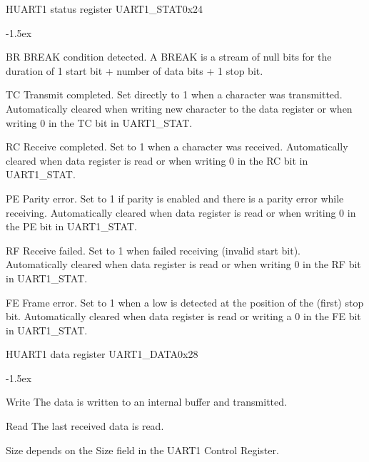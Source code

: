 \documentclass[12pt]{article}
\begin{document}
\begin{register}{H}{UART1 status register UART1\_STAT}{0x24}
\label{uart1stat}
%
%
%
%
%
%
\regnewline%
\end{register}
\begin{regdesc}[0.8\textwidth]\begin{reglist}[0000]
\itemsep-1.5ex
\item[BR] BREAK condition detected. A BREAK is a stream of null bits for the duration of 1 start bit + number of data bits + 1 stop bit.
\item[TC] Transmit completed. Set directly to 1 when a character was transmitted. Automatically cleared when writing new character to the data register or when writing 0 in the TC bit in \mbox{UART1\_STAT}.
\item[RC] Receive completed. Set to 1 when a character was received. Automatically cleared when data register is read or when writing 0 in the RC bit in UART1\_STAT.
\item[PE] Parity error. Set to 1 if parity is enabled and there is a parity error while receiving. Automatically cleared when data register is read or when writing 0 in the PE bit in UART1\_STAT.
\item[RF] Receive failed. Set to 1 when failed receiving (invalid start bit). Automatically cleared when data register is read or when writing 0 in the RF bit in UART1\_STAT.
\item [FE] Frame error. Set to 1 when a low is detected at the position of the (first) stop bit. Automatically cleared when data register is read or writing a 0 in the FE bit in UART1\_STAT.
\end{reglist}\end{regdesc}

\begin{register}{H}{UART1 data register UART1\_DATA}{0x28}
\label{uart1data}
%
\regnewline%
\end{register}
\begin{regdesc}[0.6\textwidth]\begin{reglist}[000000000]
\itemsep-1.5ex
\item[Write] The data is written to an internal buffer and transmitted.
\item[Read] The last received data is read.
\end{reglist}\end{regdesc}
\hspace*{2cm}Size depends on the Size field in the UART1 Control Register.
\end{document}
